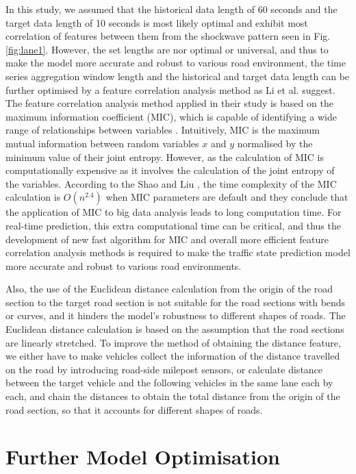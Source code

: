 \documentclass[11pt]{uonthesis}
\begin{document}
In this study, we assumed that the historical data length of 60 seconds and the target data length of 10 seconds is most likely optimal and exhibit most correlation of features between them from the shockwave pattern seen in Fig. \ref{fig:lane1}. %
However, the set lengths are nor optimal or universal, and thus to make the model more accurate and robust to various road environment, the time series aggregation window length and the historical and target data length can be further optimised by a feature correlation analysis method as Li et al. \cite{9284587} suggest. The feature correlation analysis method applied in their study is based on the maximum information coefficient (MIC), which is capable of identifying a wide range of relationships between variables \cite{mic}. %
Intuitively, MIC is the maximum mutual information between random variables $x$ and $y$ normalised by the minimum value of their joint entropy. However, as the calculation of MIC is computationally expensive as it involves the calculation of the joint entropy of the variables. According to the Shao and Liu \cite{miccomplexity}, the time complexity of the MIC calculation is $O(n^{2.4})$ when MIC parameters are default and they conclude that the application of MIC to big data analysis leads to long computation time. For real-time prediction, this extra computational time can be critical, and thus the development of new fast algorithm for MIC and overall more efficient feature correlation analysis methods is required to make the traffic state prediction model more accurate and robust to various road environments.

Also, the use of the Euclidean distance calculation from the origin of the road section to the target road section is not suitable for the road sections with bends or curves, and it hinders the model's robustness to different shapes of roads. The Euclidean distance calculation is based on the assumption that the road sections are linearly stretched. To improve the method of obtaining the distance feature, we either have to make vehicles collect the information of the distance travelled on the road by introducing road-side milepost sensors, or calculate distance between the target vehicle and the following vehicles in the same lane each by each, and chain the distances to obtain the total distance from the origin of the road section, so that it accounts for different shapes of roads.

\section{Further Model Optimisation}
\end{document}
